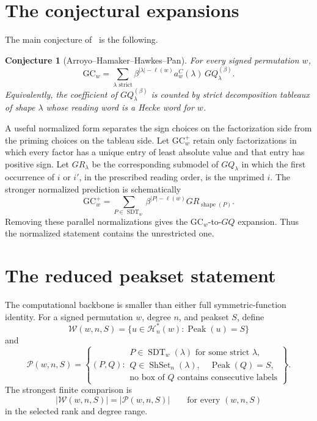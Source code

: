 \documentclass{article}
\newcommand{\Peak}{\operatorname{Peak}}
\newcommand{\shape}{\operatorname{shape}}
\newcommand{\ShSet}{\operatorname{ShSet}}
\newcommand{\SDT}{\operatorname{SDT}}
\newcommand{\GC}{\mathrm{GC}}
\newtheorem{conjecture}{Conjecture}
\begin{document}
\section{The conjectural expansions}

The main conjecture of~\cite{AHHP} is the following.

\begin{conjecture}[Arroyo--Hamaker--Hawkes--Pan]
For every signed permutation \(w\),
\[
  \GC_w
  =
  \sum_{\lambda\text{ strict}}
     \beta^{|\lambda|-\ell(w)}
     a_w^C(\lambda)\,GQ_\lambda^{(\beta)}.
\]
Equivalently, the coefficient of \(GQ_\lambda^{(\beta)}\) is counted by
strict decomposition tableaux of shape \(\lambda\) whose reading word is a
Hecke word for \(w\).
\end{conjecture}

A useful normalized form separates the sign choices on the factorization side
from the priming choices on the tableau side.  Let \(\GC_w^+\) retain only
factorizations in which every factor has a unique entry of least absolute
value and that entry has positive sign.  Let \(GR_\lambda\) be the
corresponding submodel of \(GQ_\lambda\) in which the first occurrence of
\(i\) or \(i'\), in the prescribed reading order, is the unprimed \(i\).  The
stronger normalized prediction is schematically
\[
  \GC_w^+=\sum_{P\in\SDT_w}\beta^{|P|-\ell(w)}GR_{\shape(P)}.
\]
Removing these parallel normalizations gives the \(\GC_w\)-to-\(GQ\)
expansion.  Thus the normalized statement contains the unrestricted one.

\section{The reduced peakset statement}

The computational backbone is smaller than either full symmetric-function
identity.  For a signed permutation \(w\), degree \(n\), and peakset \(S\),
define
\[
  \mathcal W(w,n,S)
  =\{u\in\mathcal H_n^*(w):\Peak(u)=S\}
\]
and
\[
  \mathcal P(w,n,S)
  =\left\{(P,Q):
  \begin{array}{l}
    P\in\SDT_w(\lambda)\text{ for some strict }\lambda,\\
    Q\in\ShSet_n(\lambda),\quad \Peak(Q)=S,\\
    \text{no box of }Q\text{ contains consecutive labels}
  \end{array}\right\}.
\]
The strongest finite comparison is
\[
  |\mathcal W(w,n,S)|=|\mathcal P(w,n,S)|
  \qquad\text{for every }(w,n,S)
\]
in the selected rank and degree range.
\end{document}
